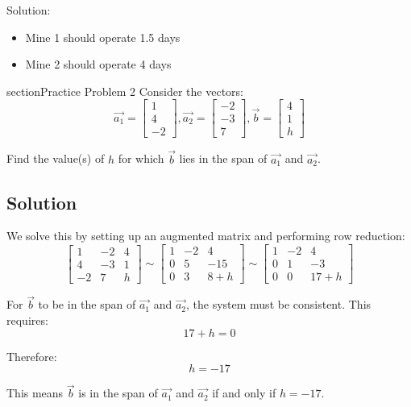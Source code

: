 \documentclass{article}
\begin{document}
Solution:
\begin{itemize}
    \item Mine 1 should operate 1.5 days
    \item Mine 2 should operate 4 days
\end{itemize}

section{Practice Problem 2}
Consider the vectors:
\[
\vec{a_1} = \begin{bmatrix} 1 \\ 4 \\ -2 \end{bmatrix}, 
\vec{a_2} = \begin{bmatrix} -2 \\ -3 \\ 7 \end{bmatrix}, 
\vec{b} = \begin{bmatrix} 4 \\ 1 \\ h \end{bmatrix}
\]

Find the value(s) of $h$ for which $\vec{b}$ lies in the span of $\vec{a_1}$ and $\vec{a_2}$.

\subsection{Solution}
We solve this by setting up an augmented matrix and performing row reduction:
\[
\begin{bmatrix} 
1 & -2 & 4 \\
4 & -3 & 1 \\
-2 & 7 & h
\end{bmatrix} \sim 
\begin{bmatrix}
1 & -2 & 4 \\
0 & 5 & -15 \\
0 & 3 & 8+h
\end{bmatrix} \sim
\begin{bmatrix}
1 & -2 & 4 \\
0 & 1 & -3 \\
0 & 0 & 17+h
\end{bmatrix}
\]

For $\vec{b}$ to be in the span of $\vec{a_1}$ and $\vec{a_2}$, the system must be consistent. This requires:
\[
17 + h = 0
\]

Therefore:
\[
h = -17
\]

This means $\vec{b}$ is in the span of $\vec{a_1}$ and $\vec{a_2}$ if and only if $h = -17$.
\end{document}
